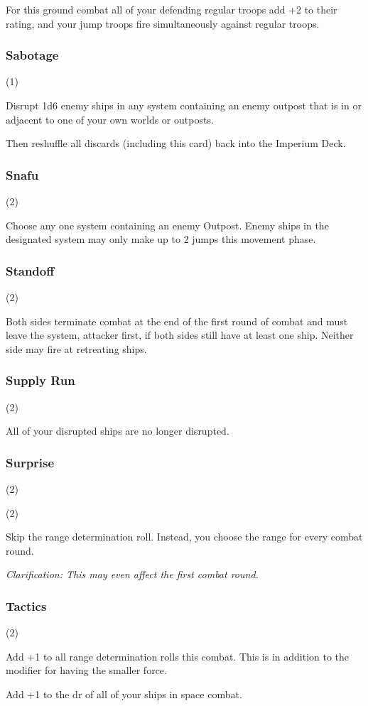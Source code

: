 
For this ground combat all of your defending regular troops add +2 to their rating, and your jump troops fire simultaneously against regular troops.

\subsubsection{Sabotage} (1)


Disrupt 1d6 enemy ships in any system containing an enemy outpost that is in or adjacent to one of your own worlds or outposts.

Then reshuffle all discards (including this card) back into the Imperium Deck.

\subsubsection{Snafu} (2)


Choose any one system containing an enemy Outpost. Enemy ships in the designated system may only make up to 2 jumps this movement phase.

\subsubsection{Standoff} (2)


Both sides terminate combat at the end of the first round of combat and must leave the system, attacker first, if both sides still have at least one ship. Neither side may fire at retreating ships.

\subsubsection{Supply Run} (2)


All of your disrupted ships are no longer disrupted.

\subsubsection{Surprise} (2)

 (2)

Skip the range determination roll. Instead, you choose the range for every combat round.

\textit{Clarification: This may even affect the first combat round.}

\subsubsection{Tactics} (2)

Add +1 to all range determination rolls this combat. This is in addition to the modifier for having the smaller force.

Add +1 to the dr of all of your ships in space combat.